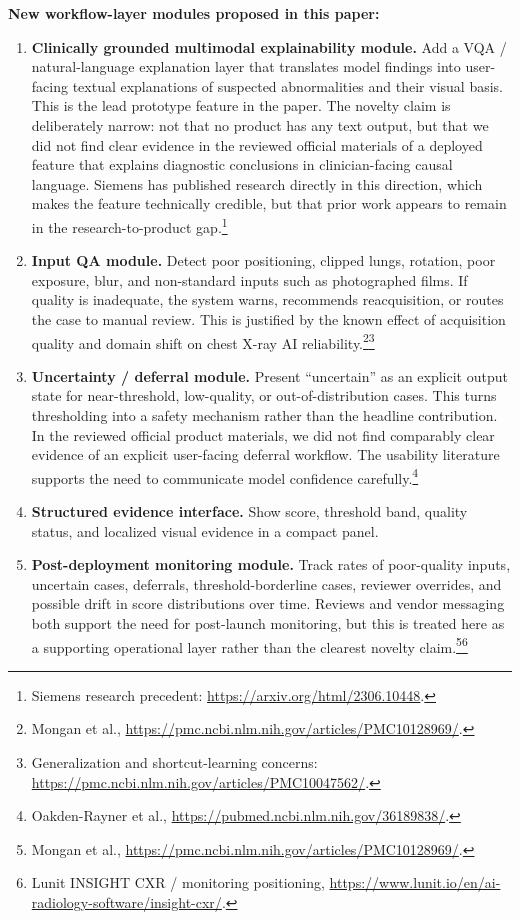 \documentclass[11pt]{article}
\begin{document}
\textbf{New workflow-layer modules proposed in this paper:}
\begin{enumerate}[leftmargin=1.8em]
    \item \textbf{Clinically grounded multimodal explainability module.} Add a VQA / natural-language explanation layer that translates model findings into user-facing textual explanations of suspected abnormalities and their visual basis. This is the lead prototype feature in the paper. The novelty claim is deliberately narrow: not that no product has any text output, but that we did not find clear evidence in the reviewed official materials of a deployed feature that explains diagnostic conclusions in clinician-facing causal language. Siemens has published research directly in this direction, which makes the feature technically credible, but that prior work appears to remain in the research-to-product gap.\footnote{Siemens research precedent: \url{https://arxiv.org/html/2306.10448}.}
    \item \textbf{Input QA module.} Detect poor positioning, clipped lungs, rotation, poor exposure, blur, and non-standard inputs such as photographed films. If quality is inadequate, the system warns, recommends reacquisition, or routes the case to manual review. This is justified by the known effect of acquisition quality and domain shift on chest X-ray AI reliability.\footnote{Mongan et al., \url{https://pmc.ncbi.nlm.nih.gov/articles/PMC10128969/}.}\footnote{Generalization and shortcut-learning concerns: \url{https://pmc.ncbi.nlm.nih.gov/articles/PMC10047562/}.}
    \item \textbf{Uncertainty / deferral module.} Present ``uncertain'' as an explicit output state for near-threshold, low-quality, or out-of-distribution cases. This turns thresholding into a safety mechanism rather than the headline contribution. In the reviewed official product materials, we did not find comparably clear evidence of an explicit user-facing deferral workflow. The usability literature supports the need to communicate model confidence carefully.\footnote{Oakden-Rayner et al., \url{https://pubmed.ncbi.nlm.nih.gov/36189838/}.}
    \item \textbf{Structured evidence interface.} Show score, threshold band, quality status, and localized visual evidence in a compact panel.
    \item \textbf{Post-deployment monitoring module.} Track rates of poor-quality inputs, uncertain cases, deferrals, threshold-borderline cases, reviewer overrides, and possible drift in score distributions over time. Reviews and vendor messaging both support the need for post-launch monitoring, but this is treated here as a supporting operational layer rather than the clearest novelty claim.\footnote{Mongan et al., \url{https://pmc.ncbi.nlm.nih.gov/articles/PMC10128969/}.}\footnote{Lunit INSIGHT CXR / monitoring positioning, \url{https://www.lunit.io/en/ai-radiology-software/insight-cxr/}.}
\end{enumerate}
\end{document}
